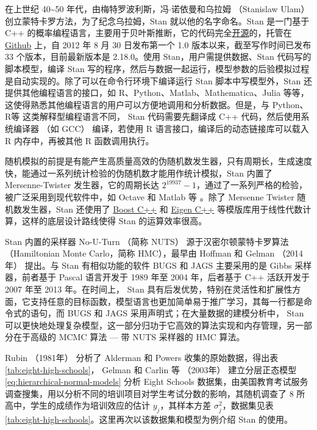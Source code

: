 \documentclass[12pt,a4paper,UTF8,twoside]{book}
\theoremstyle{definition}
\theoremstyle{definition}
\theoremstyle{definition}
\theoremstyle{remark}
\begin{document}
在上世纪 40\textasciitilde{}50
年代，由梅特罗波利斯，冯\(\cdot\)诺依曼和乌拉姆 （Stanislaw Ulam）
创立蒙特卡罗方法，为了纪念乌拉姆，Stan 就以他的名字命名。Stan 是一门基于
C++
的概率编程语言，主要用于贝叶斯推断，它的代码完全\href{http://mc-stan.org/}{开源}的，托管在
\href{https://github.com/stan-dev/stan}{Github} 上，自 2012 年 8 月 30
日发布第一个 1.0 版本以来，截至写作时间已发布 33 个版本，目前最新版本是
2.18.0。使用 Stan，用户需提供数据、Stan 代码写的脚本模型，编译 Stan
写的程序，然后与数据一起运行，模型参数的后验模拟过程是自动实现的。除了可以在命令行环境下编译运行
Stan 脚本中写模型外，Stan 还提供其他编程语言的接口，如
R、Python、Matlab、Mathematica、Julia
等等，这使得熟悉其他编程语言的用户可以方便地调用和分析数据。但是，与
Python、R等 这类解释型编程语言不同， Stan 代码需要先翻译成 C++
代码，然后使用系统编译器 （如 GCC） 编译，若使用 R
语言接口，编译后的动态链接库可以载入 R 内存中，再被其他 R 函数调用执行。

随机模拟的前提是有能产生高质量高效的伪随机数发生器，只有周期长，生成速度快，能通过一系列统计检验的伪随机数才能用作统计模拟，Stan
内置了 Mersenne-Twister 发生器，它的周期长达
\(2^{19937}-1\)，通过了一系列严格的检验，被广泛采用到现代软件中，如
Octave 和 Matlab 等 \citep{Huang2017COS}。除了 Mersenne Twister
随机数发生器，Stan 还使用了 \href{https://www.boost.org/}{Boost C++} 和
\href{http://eigen.tuxfamily.org/index.php?title=Main_Page}{Eigen C++}
等模版库用于线性代数计算，这样的底层设计路线使得 Stan 的运算效率很高。

Stan 内置的采样器 No-U-Turn （简称 NUTS） 源于汉密尔顿蒙特卡罗算法
（Hamiltonian Monte Carlo，简称 HMC），最早由 Hoffman 和 Gelman
（2014年） \citep{hoffman2014} 提出。与 Stan 有相似功能的软件 BUGS 和
JAGS 主要采用的是 Gibbs 采样器，前者基于 Pascal 语言开发于 1989 年至
2004 年，后者基于 C++ 活跃开发于 2007 年至 2013 年。在时间上， Stan
具有后发优势，特别在灵活性和扩展性方面，它支持任意的目标函数，模型语言也更加简单易于推广学习，其每一行都是命令式的语句，而
BUGS 和 JAGS 采用声明式；在大量数据的建模分析中， Stan
可以更快地处理复杂模型，这一部分归功于它高效的算法实现和内存管理，另一部分在于高级的
MCMC 算法 --- 带 NUTS 采样器的 HMC 算法。

Rubin （1981年） \citep{Rubin1981} 分析了 Alderman 和 Powers
\citep{Alderman1980} 收集的原始数据，得出表
\ref{tab:eight-high-schools}， Gelman 和 Carlin 等 （2003年）
\citep{Gelman2003} 建立分层正态模型 \eqref{eq:hierarchical-normal-models}
分析 Eight Schools
数据集，由美国教育考试服务调查搜集，用以分析不同的培训项目对学生考试分数的影响，其随机调查了
8 所高中，学生的成绩作为培训效应的估计 \(y_j\)，其样本方差
\(\sigma^2_j\)，数据集见表
\ref{tab:eight-high-schools}。这里再次以该数据集和模型为例介绍 Stan
的使用。
\end{document}
